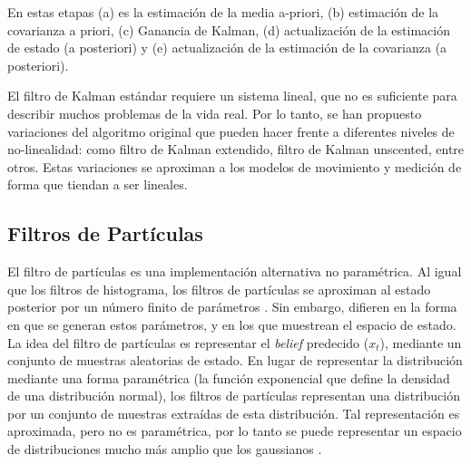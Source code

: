 En estas etapas (a) es la estimación de la media a-priori, (b) estimación de la 
covarianza a priori, (c) Ganancia de Kalman, (d) actualización de la estimación de 
estado (a posteriori) y (e) actualización de la estimación de la covarianza (a posteriori).


El filtro de Kalman estándar requiere un sistema lineal, que no es suficiente para 
describir muchos problemas de la vida real. Por lo tanto, se han propuesto 
variaciones del algoritmo original que pueden hacer frente a diferentes niveles de 
no-linealidad: como filtro de Kalman extendido, filtro de Kalman unscented, entre otros.
Estas variaciones se aproximan a los modelos de movimiento y medición 
de forma que tiendan a ser lineales.


\subsection{Filtros de Part\'iculas}
El filtro de part\'iculas es una implementaci\'on alternativa no param\'etrica. Al 
igual que los filtros de histograma, los filtros de part\'iculas se aproximan al 
estado posterior por un n\'umero finito de par\'ametros \cite{arulampalam2002tutorial}. Sin 
embargo, difieren en la forma en que se generan estos par\'ametros, y en los que 
muestrean el espacio de estado. La idea del filtro de part\'iculas es representar 
el \textit{belief} predecido ($x_{t}$), mediante un conjunto de muestras aleatorias de 
estado. En lugar de representar la distribuci\'on mediante una forma param\'etrica 
(la funci\'on exponencial que define la densidad de una distribuci\'on normal), los 
filtros de part\'iculas representan una distribuci\'on por un conjunto de muestras 
extra\'idas de esta distribuci\'on. Tal representaci\'on es aproximada, pero 
no es param\'etrica, por lo tanto se puede representar un espacio de distribuciones 
mucho m\'as amplio que los gaussianos \cite{calle2014navegacion}.


